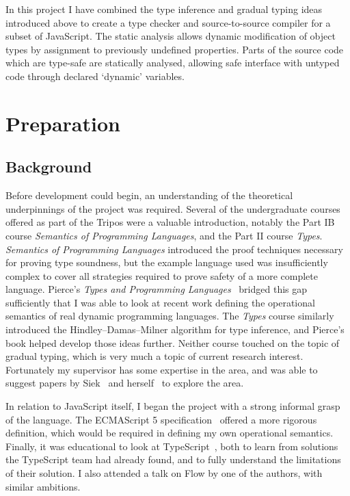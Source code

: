 \documentclass[12pt,a4paper,twoside,openright]{report}
\begin{document}
In this project I have combined the type inference and gradual typing ideas
introduced above to create a type checker and source-to-source compiler for a
subset of JavaScript. The static analysis allows dynamic modification of
object types by assignment to previously undefined properties. Parts of the
source code which are type-safe are statically analysed, allowing safe
interface with untyped code through declared `dynamic' variables.

\chapter{Preparation}\label{preparation} \section{Background}
Before development could begin, an understanding of the theoretical
underpinnings of the project was required. Several of the undergraduate courses
offered as part of the Tripos were a valuable introduction, notably the Part IB
course \textit{Semantics of Programming Languages}, and the Part II course
\textit{Types}. \textit{Semantics of Programming Languages} introduced the
proof techniques necessary for proving type soundness, but the example language
used was insufficiently complex to cover all strategies required to prove
safety of a more complete language. Pierce's \textit{Types and Programming
Languages}~\cite{pierce} bridged this gap sufficiently that I was able to look
at recent work defining the operational semantics of real dynamic programming
languages\cite{pythonOpSem}. The \textit{Types} course similarly introduced the
Hindley--Damas--Milner algorithm for type inference, and Pierce's book helped
develop those ideas further. Neither course touched on the topic of gradual
typing, which is very much a topic of current research interest. Fortunately my
supervisor has some expertise in the area, and was able to suggest papers by
Siek~\cite{gradSiek, gradSiek2} and herself~\cite{gradGray} to explore the
area.

In relation to JavaScript itself, I began the project with a strong informal
grasp of the language. The ECMAScript 5 specification~\cite{ecmaSpec} offered a
more rigorous definition, which would be required in defining my own
operational semantics. Finally, it was educational to look at
TypeScript~\cite{ts,understandingTS}, both to learn from solutions the
TypeScript team had already found, and to fully understand the limitations of
their solution. I also attended a talk on Flow by one of the authors, with
similar ambitions.
\end{document}
